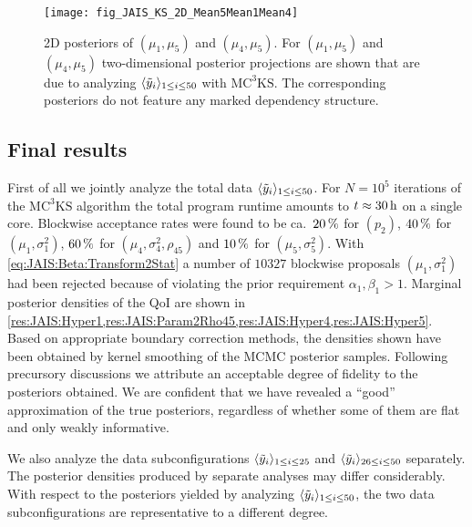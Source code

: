 \begin{figure}[p]
  \centering
  \texttt{[image: fig\_JAIS\_KS\_2D\_Mean5Mean1Mean4]}
  \caption[2D posteriors of \((\mu_1,\mu_5)\) and \((\mu_4,\mu_5)\)]{2D posteriors of \((\mu_1,\mu_5)\) and \((\mu_4,\mu_5)\).
           For \((\mu_1,\mu_5)\) and \((\mu_4,\mu_5)\) two-dimensional posterior projections are shown that are due to analyzing \(\langle{\tilde{y}_i}\rangle_{1 \leq i \leq 50}\) with \(\text{MC}^3\text{KS}\).
           The corresponding posteriors do not feature any marked dependency structure.
          }
  \label{res:JAIS:2D:Mean5Mean1Mean4}
\end{figure}

\subsection{Final results}
First of all we jointly analyze the total data \(\langle{\tilde{y}_i}\rangle_{1 \leq i \leq 50}\).
For \(N=10^5\) iterations of the \(\text{MC}^3\text{KS}\) algorithm the total program runtime amounts to \(t \approx \unit[30]{h}\) on a single core.
Blockwise acceptance rates were found to be ca.\ \(\unit[20]{\%}\) for \((p_2)\), \(\unit[40]{\%}\) for \((\mu_1,\sigma^2_1)\),
\(\unit[60]{\%}\) for \((\mu_4,\sigma^2_4,\rho_{45})\) and \(\unit[10]{\%}\) for \((\mu_5,\sigma^2_5)\).
With \cref{eq:JAIS:Beta:Transform2Stat} a number of \(10327\) blockwise proposals \((\mu_1,\sigma^2_1)\) had been rejected because of violating the prior requirement \(\alpha_1,\beta_1>1\).
Marginal posterior densities of the QoI are shown in \cref{res:JAIS:Hyper1,res:JAIS:Param2Rho45,res:JAIS:Hyper4,res:JAIS:Hyper5}.
Based on appropriate boundary correction methods, the densities shown have been obtained by kernel smoothing of the MCMC posterior samples.
Following precursory discussions we attribute an acceptable degree of fidelity to the posteriors obtained.
We are confident that we have revealed a ``good'' approximation of the true posteriors, regardless of whether some of them are flat and only weakly informative.
\par %
We also analyze the data subconfigurations \(\langle{\tilde{y}_i}\rangle_{1 \leq i \leq 25}\) and \(\langle{\tilde{y}_i}\rangle_{26 \leq i \leq 50}\) separately.
The posterior densities produced by separate analyses may differ considerably.
With respect to the posteriors yielded by analyzing \(\langle{\tilde{y}_i}\rangle_{1 \leq i \leq 50}\), the two data subconfigurations are representative to a different degree.
